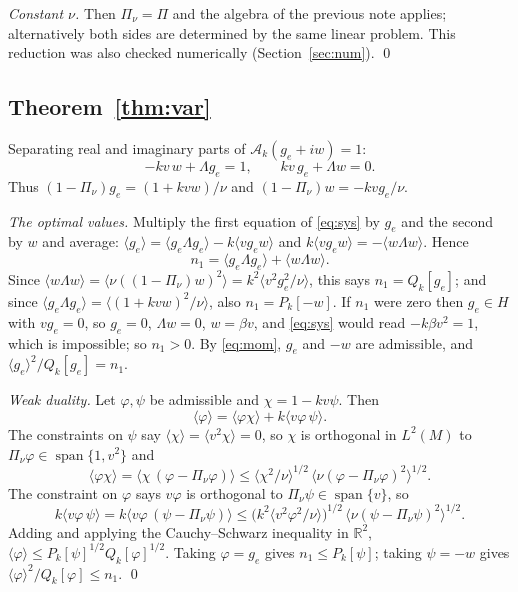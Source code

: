 \documentclass[11pt]{article}
\newcommand{\cA}{\mathcal{A}}
\newcommand{\avg}[1]{\langle #1\rangle}
\theoremstyle{remark}
\begin{document}
\emph{Constant $\nu$.} Then $\Pi_\nu=\Pi$ and the algebra of the previous
note applies; alternatively both sides are determined by the same linear
problem. This reduction was also checked numerically
(Section~\ref{sec:num}). \qed

\subsection{Theorem~\ref{thm:var}}

Separating real and imaginary parts of $\cA_k(g_e+iw)=1$:
\begin{equation}
  -kv\,w + \Lambda g_e = 1,\qquad kv\,g_e + \Lambda w = 0 .
  \label{eq:sys}
\end{equation}
Thus $(1-\Pi_\nu)g_e = (1+kvw)/\nu$ and $(1-\Pi_\nu)w = -kvg_e/\nu$.

\emph{The optimal values.} Multiply the first equation of \eqref{eq:sys} by
$g_e$ and the second by $w$ and average:
$\avg{g_e} = \avg{g_e\Lambda g_e} - k\avg{vg_ew}$ and
$k\avg{vg_ew} = -\avg{w\Lambda w}$. Hence
\begin{equation}
  n_1 = \avg{g_e\Lambda g_e} + \avg{w\Lambda w}.
  \label{eq:n1Q}
\end{equation}
Since $\avg{w\Lambda w} = \avg{\nu((1-\Pi_\nu)w)^2} = k^2\avg{v^2g_e^2/\nu}$,
this says $n_1 = Q_k[g_e]$; and since
$\avg{g_e\Lambda g_e} = \avg{(1+kvw)^2/\nu}$, also $n_1 = P_k[-w]$. If $n_1$
were zero then $g_e\in H$ with $vg_e = 0$, so $g_e=0$, $\Lambda w=0$,
$w=\beta v$, and \eqref{eq:sys} would read $-k\beta v^2=1$, which is
impossible; so $n_1>0$. By \eqref{eq:mom}, $g_e$ and $-w$ are admissible,
and $\avg{g_e}^2/Q_k[g_e] = n_1$.

\emph{Weak duality.} Let $\varphi,\psi$ be admissible and
$\chi = 1-kv\psi$. Then
\[
  \avg{\varphi} = \avg{\varphi\chi} + k\avg{v\varphi\,\psi}.
\]
The constraints on $\psi$ say $\avg{\chi}=\avg{v^2\chi}=0$, so $\chi$ is
orthogonal in $L^2(M)$ to $\Pi_\nu\varphi\in\operatorname{span}\{1,v^2\}$ and
\[
  \avg{\varphi\chi} = \avg{\chi\,(\varphi-\Pi_\nu\varphi)}
  \le \avg{\chi^2/\nu}^{1/2}\,\avg{\nu(\varphi-\Pi_\nu\varphi)^2}^{1/2}.
\]
The constraint on $\varphi$ says $v\varphi$ is orthogonal to
$\Pi_\nu\psi\in\operatorname{span}\{v\}$, so
\[
  k\avg{v\varphi\,\psi} = k\avg{v\varphi\,(\psi-\Pi_\nu\psi)}
  \le \bigl(k^2\avg{v^2\varphi^2/\nu}\bigr)^{1/2}\,
      \avg{\nu(\psi-\Pi_\nu\psi)^2}^{1/2}.
\]
Adding and applying the Cauchy--Schwarz inequality in $\mathbb{R}^2$,
$\avg{\varphi}\le P_k[\psi]^{1/2}Q_k[\varphi]^{1/2}$. Taking $\varphi=g_e$
gives $n_1\le P_k[\psi]$; taking $\psi=-w$ gives
$\avg{\varphi}^2/Q_k[\varphi]\le n_1$. \qed
\end{document}

